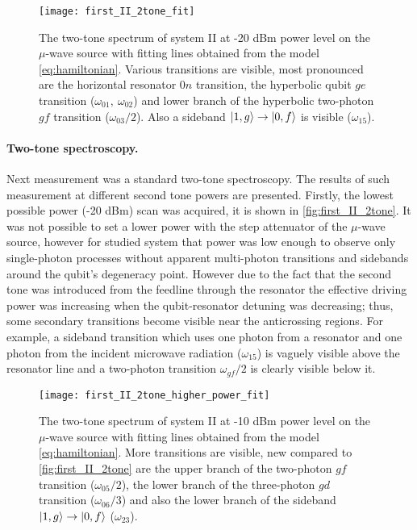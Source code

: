 \documentclass[12pt, twoside]{report}
\DeclarePairedDelimiter\ket{\lvert}{\rangle}
\numberwithin{equation}{section}
\begin{document}
\begin{figure}
\centering
\texttt{[image: first\_II\_2tone\_fit]}
\caption{The two-tone spectrum of system II at -20 dBm power level on the $\mu$-wave source with fitting lines obtained from the model \eqref{eq:hamiltonian}. Various transitions are visible, most pronounced are the horizontal resonator $0n$ transition, the hyperbolic qubit $ge$ transition ($\omega_{01},\ \omega_{02}$) and lower branch of the hyperbolic two-photon $gf$ transition ($\omega_{03}/2$). Also a sideband $\ket{1,g}\rightarrow \ket{0,f}$ is visible ($\omega_{15}$).}
\label{fig:first_II_2tone}
\end{figure}


\paragraph{Two-tone spectroscopy.} Next measurement was a standard two-tone spectroscopy. The results of such measurement at different second tone powers are presented. Firstly, the lowest possible power (-20 dBm) scan was acquired, it is shown in \autoref{fig:first_II_2tone}. It was not possible to set a lower power with the step attenuator of the $\mu$-wave source, however for studied system that power was low enough to observe only single-photon processes without apparent multi-photon transitions and sidebands around the qubit's degeneracy point. However due to the fact that the second tone was introduced from the feedline through the resonator the effective driving power was increasing when the qubit-resonator detuning was decreasing; thus, some secondary transitions become visible near the anticrossing regions. For example, a sideband transition which uses one photon from a resonator and one photon from the incident microwave radiation ($\omega_{15}$) is vaguely visible above the resonator line and a two-photon transition $\omega_{gf}/2$ is clearly visible below it.

\begin{figure}
\centering
\texttt{[image: first\_II\_2tone\_higher\_power\_fit]}
\caption{The two-tone spectrum of system II at -10 dBm power level on the $\mu$-wave source with fitting lines obtained from the model \eqref{eq:hamiltonian}. More transitions are visible, new compared to \autoref{fig:first_II_2tone} are the upper branch of the two-photon $gf$ transition ($\omega_{05}/2$), the lower branch of the three-photon $gd$ transition ($\omega_{06}/3$) and also the lower branch of the sideband $\ket{1,g}\rightarrow \ket{0,f}$ ($\omega_{23}$).}
\label{fig:first_II_2tone_hp}
\end{figure}
\end{document}
